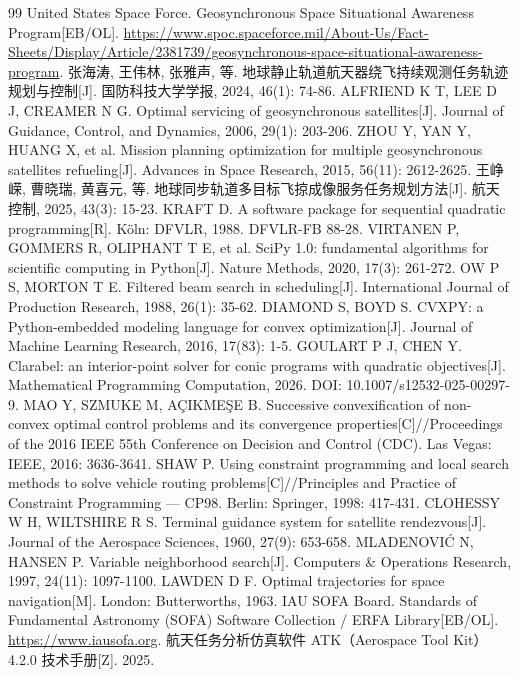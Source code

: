 \begin{thebibliography}{99}
\setlength{\itemsep}{2pt}
 United States Space Force. Geosynchronous Space Situational Awareness Program[EB/OL]. \url{https://www.spoc.spaceforce.mil/About-Us/Fact-Sheets/Display/Article/2381739/geosynchronous-space-situational-awareness-program}.
 张海涛, 王伟林, 张雅声, 等. 地球静止轨道航天器绕飞持续观测任务轨迹规划与控制[J]. 国防科技大学学报, 2024, 46(1): 74-86.
 ALFRIEND K T, LEE D J, CREAMER N G. Optimal servicing of geosynchronous satellites[J]. Journal of Guidance, Control, and Dynamics, 2006, 29(1): 203-206.
 ZHOU Y, YAN Y, HUANG X, et al. Mission planning optimization for multiple geosynchronous satellites refueling[J]. Advances in Space Research, 2015, 56(11): 2612-2625.
 王峥嵘, 曹晓瑞, 黄喜元, 等. 地球同步轨道多目标飞掠成像服务任务规划方法[J]. 航天控制, 2025, 43(3): 15-23.
 KRAFT D. A software package for sequential quadratic programming[R]. Köln: DFVLR, 1988. DFVLR-FB 88-28.
 VIRTANEN P, GOMMERS R, OLIPHANT T E, et al. SciPy 1.0: fundamental algorithms for scientific computing in Python[J]. Nature Methods, 2020, 17(3): 261-272.
 OW P S, MORTON T E. Filtered beam search in scheduling[J]. International Journal of Production Research, 1988, 26(1): 35-62.
 DIAMOND S, BOYD S. CVXPY: a Python-embedded modeling language for convex optimization[J]. Journal of Machine Learning Research, 2016, 17(83): 1-5.
 GOULART P J, CHEN Y. Clarabel: an interior-point solver for conic programs with quadratic objectives[J]. Mathematical Programming Computation, 2026. DOI: 10.1007/s12532-025-00297-9.
 MAO Y, SZMUKE M, AÇIKMEŞE B. Successive convexification of non-convex optimal control problems and its convergence properties[C]//Proceedings of the 2016 IEEE 55th Conference on Decision and Control (CDC). Las Vegas: IEEE, 2016: 3636-3641.
 SHAW P. Using constraint programming and local search methods to solve vehicle routing problems[C]//Principles and Practice of Constraint Programming — CP98. Berlin: Springer, 1998: 417-431.
 CLOHESSY W H, WILTSHIRE R S. Terminal guidance system for satellite rendezvous[J]. Journal of the Aerospace Sciences, 1960, 27(9): 653-658.
 MLADENOVIĆ N, HANSEN P. Variable neighborhood search[J]. Computers \& Operations Research, 1997, 24(11): 1097-1100.
 LAWDEN D F. Optimal trajectories for space navigation[M]. London: Butterworths, 1963.
 IAU SOFA Board. Standards of Fundamental Astronomy (SOFA) Software Collection / ERFA Library[EB/OL]. \url{https://www.iausofa.org}.
 航天任务分析仿真软件 ATK（Aerospace Tool Kit）4.2.0 技术手册[Z]. 2025.
\end{thebibliography}
